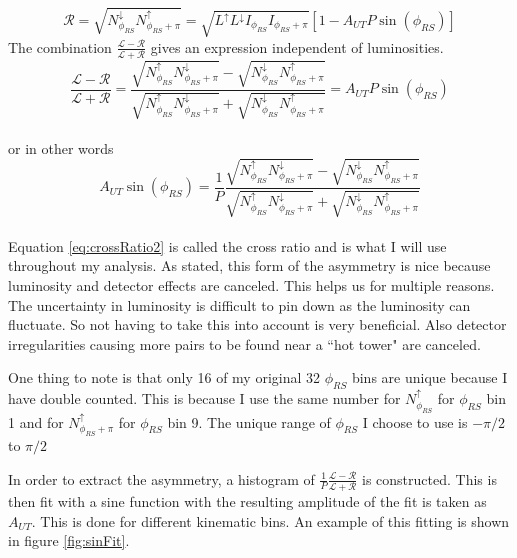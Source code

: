 \documentclass[abstract = on,listof=totoc, bibliography=totoc]{scrreprt}
\newcommand{\phirs}{\phi_{RS}}
\begin{document}
\begin{equation}
\mathcal{R} = \sqrt{N^\downarrow_{\phi_{RS}}N^\uparrow_{\phi_{RS}+\pi}} = \sqrt{L^\uparrow L^\downarrow I_{\phi_{RS}} I_{\phi_{RS}+\pi}} \left[ 1-A_{UT}P\sin(\phi_{RS})\right]
\end{equation}
The combination $\frac{\mathcal{L} - \mathcal{R}}{\mathcal{L} + \mathcal{R}}$  gives an expression independent of luminosities. 
\begin{equation}
\label{eq:crossRatio}
\frac{\mathcal{L} - \mathcal{R}}{\mathcal{L} +\mathcal{R}} = \frac{\sqrt{N^\uparrow_{\phi_{RS}}N^\downarrow_{\phi_{RS}+\pi}} - \sqrt{N^\downarrow_{\phi_{RS}}N^\uparrow_{\phi_{RS}+\pi}}}{\sqrt{N^\uparrow_{\phi_{RS}}N^\downarrow_{\phi_{RS}+\pi}} + \sqrt{N^\downarrow_{\phi_{RS}}N^\uparrow_{\phi_{RS}+\pi}}} = A_{UT}P\sin(\phi_{RS})
\end{equation}\\
or in other words
\begin{equation}
\label{eq:crossRatio2}
A_{UT}\sin\left(\phirs\right) = \frac{1}{P}\frac{\sqrt{N^\uparrow_{\phi_{RS}}N^\downarrow_{\phi_{RS}+\pi}} - \sqrt{N^\downarrow_{\phi_{RS}}N^\uparrow_{\phi_{RS}+\pi}}}{\sqrt{N^\uparrow_{\phi_{RS}}N^\downarrow_{\phi_{RS}+\pi}} + \sqrt{N^\downarrow_{\phi_{RS}}N^\uparrow_{\phi_{RS}+\pi}}}
\end{equation}\\

Equation \ref{eq:crossRatio2} is called the cross ratio and is what I will use throughout my analysis. As stated, this form of the asymmetry is nice because luminosity and detector effects are canceled. This helps us for multiple reasons. The uncertainty in luminosity is difficult to pin down as the luminosity can fluctuate. So not having to take this into account is very beneficial. Also detector irregularities causing more pairs to be found near a ``hot tower" are canceled.

One thing to note is that only 16 of my original 32 $\phi_{RS}$ bins are unique because I have double counted. This is because I use the same number for $N^\uparrow_{\phi_{RS}}$ for $\phi_{RS}$ bin 1 and for $N^\uparrow_{\phi_{RS}+\pi}$ for $\phi_{RS}$ bin 9. The unique range of $\phi_{RS}$ I choose to use is $-\pi/2$ to $\pi/2$

In order to extract the asymmetry, a histogram of $\frac{1}{P}\frac{\mathcal{L} - \mathcal{R}}{\mathcal{L} + \mathcal{R}}$ is constructed. This is then fit with a sine function with the resulting amplitude of the fit is taken as $A_{UT}$. This is done for different kinematic bins. An example of this fitting is shown in figure \ref{fig:sinFit}. 
\end{document}
